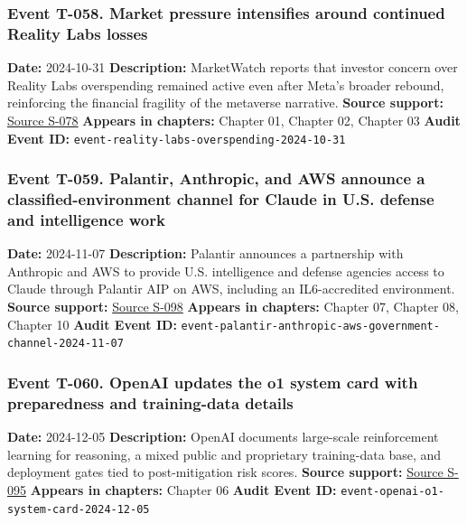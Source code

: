 \documentclass[
  american,
  11pt,
  letterpaper,
]{article}
\begin{document}
\subsubsection{Event T-058. Market pressure intensifies around continued
Reality Labs
losses}\label{event-t-058-market-pressure-intensifies-around-continued-reality-labs-losses}

\textbf{Date:} 2024-10-31 \textbf{Description:} MarketWatch reports that
investor concern over Reality Labs overspending remained active even
after Meta's broader rebound, reinforcing the financial fragility of the
metaverse narrative. \textbf{Source support:}
\hyperref[source-s-078-with-reality-labs-meta-risks-heading-down-slippery-slope-of-overspending-again]{Source
S-078} \textbf{Appears in chapters:} Chapter 01, Chapter 02, Chapter 03
\textbf{Audit Event ID:}
\texttt{event-reality-labs-overspending-2024-10-31}

\subsubsection{Event T-059. Palantir, Anthropic, and AWS announce a
classified-environment channel for Claude in U.S. defense and
intelligence
work}\label{event-t-059-palantir-anthropic-and-aws-announce-a-classified-environment-channel-for-claude-in-u-s-defense-and-intelligence-work}

\textbf{Date:} 2024-11-07 \textbf{Description:} Palantir announces a
partnership with Anthropic and AWS to provide U.S. intelligence and
defense agencies access to Claude through Palantir AIP on AWS, including
an IL6-accredited environment. \textbf{Source support:}
\hyperref[source-s-098-anthropic-and-palantir-partner-to-bring-claude-ai-models-to-aws-for-u-s-government-intelligence-and-defense-operations]{Source
S-098} \textbf{Appears in chapters:} Chapter 07, Chapter 08, Chapter 10
\textbf{Audit Event ID:}
\texttt{event-palantir-anthropic-aws-government-channel-2024-11-07}

\subsubsection{Event T-060. OpenAI updates the o1 system card with
preparedness and training-data
details}\label{event-t-060-openai-updates-the-o1-system-card-with-preparedness-and-training-data-details}

\textbf{Date:} 2024-12-05 \textbf{Description:} OpenAI documents
large-scale reinforcement learning for reasoning, a mixed public and
proprietary training-data base, and deployment gates tied to
post-mitigation risk scores. \textbf{Source support:}
\hyperref[source-s-095-openai-o1-system-card]{Source S-095}
\textbf{Appears in chapters:} Chapter 06 \textbf{Audit Event ID:}
\texttt{event-openai-o1-system-card-2024-12-05}
\end{document}
